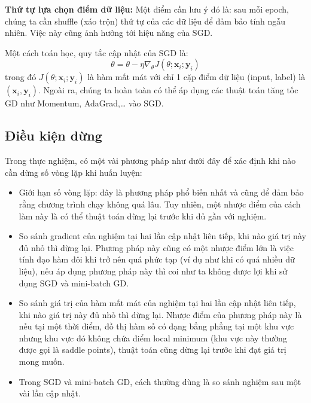 \textbf{Thứ tự lựa chọn điểm dữ liệu:}
Một điểm cần lưu ý đó là: sau mỗi epoch, chúng ta cần shuffle (xáo trộn) thứ tự của các dữ liệu để đảm bảo tính ngẫu nhiên. Việc này cũng ảnh hưởng tới hiệu năng của SGD.

Một cách toán học, quy tắc cập nhật của SGD là:
$$\theta = \theta - \eta \nabla_{\theta} J(\theta; \mathbf{x}_i; \mathbf{y}_i)$$
trong đó $J(\theta; \mathbf{x}_i; \mathbf{y}_i)$ là hàm mất mát với chỉ 1 cặp điểm dữ liệu (input, label) là $(\mathbf{x}_i, \mathbf{y}_i)$. Ngoài ra, chúng ta hoàn toàn có thể áp dụng các thuật toán tăng tốc GD như Momentum, AdaGrad,… vào SGD.

\subsection{Điều kiện dừng}
Trong thực nghiệm, có một vài phương pháp như dưới đây để xác định khi nào cần dừng số vòng lặp khi huấn luyện:
\begin{itemize}
\item Giới hạn số vòng lặp: đây là phương pháp phổ biến nhất và cũng để đảm bảo rằng chương trình chạy không quá lâu. Tuy nhiên, một nhược điểm của cách làm này là có thể thuật toán dừng lại trước khi đủ gần với nghiệm.
\item So sánh gradient của nghiệm tại hai lần cập nhật liên tiếp, khi nào giá trị này đủ nhỏ thì dừng lại. Phương pháp này cũng có một nhược điểm lớn là việc tính đạo hàm đôi khi trở nên quá phức tạp (ví dụ như khi có quá nhiều dữ liệu), nếu áp dụng phương pháp này thì coi như ta không được lợi khi sử dụng SGD và mini-batch GD.
\item So sánh giá trị của hàm mất mát của nghiệm tại hai lần cập nhật liên tiếp, khi nào giá trị này đủ nhỏ thì dừng lại. Nhược điểm của phương pháp này là nếu tại một thời điểm, đồ thị hàm số có dạng bẳng phẳng tại một khu vực nhưng khu vực đó không chứa điểm local minimum (khu vực này thường được gọi là saddle points), thuật toán cũng dừng lại trước khi đạt giá trị mong muốn.
\item Trong SGD và mini-batch GD, cách thường dùng là so sánh nghiệm sau một vài lần cập nhật.
\end{itemize}

